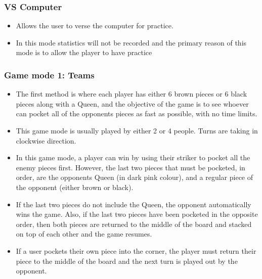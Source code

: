 \documentclass[11pt,a4paper]{report}
\begin{document}
\subsubsection{VS Computer}
\begin{itemize}
    \item Allows the user to verse the computer for practice.
    \item In this mode statistics will not be recorded and the primary reason of this mode is to allow the player to have practice
\end{itemize}

\subsubsection{Game mode 1: Teams}
\begin{itemize}
    \item The first method is where each player has either 6 brown pieces or 6 black pieces along with a Queen, and the objective of the game is to see whoever can pocket all of the opponents pieces as fast as possible, with no time limits.
    \item This game mode is usually played by either 2 or 4 people. Turns are taking in clockwise direction.
    \item In this game mode, a player can win by using their striker to pocket all the enemy pieces first. However, the last two pieces that must be pocketed, in order, are the opponents Queen (in dark pink colour), and a regular piece of the opponent (either brown or black).
    \item If the last two pieces do not include the Queen, the opponent automatically wins the game. Also, if the last two pieces have been pocketed in the opposite order, then both pieces are returned to the middle of the board and stacked on top of each other and the game resumes.
    \item If a user pockets their own piece into the corner, the player must return their piece to the middle of the board and the next turn is played out by the opponent.
\end{itemize}
\end{document}
